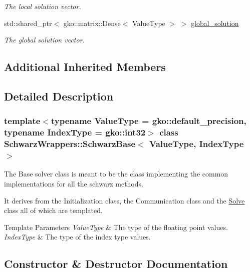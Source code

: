 \begin{DoxyCompactItemize}
\begin{DoxyCompactList}\small\item\em The local solution vector. \end{DoxyCompactList}\item 
\mbox{\label{classSchwarzWrappers_1_1SchwarzBase_a0c7d2f1b2a97968bd662ba3cbac800f6}} 
std\+::shared\+\_\+ptr$<$ gko\+::matrix\+::\+Dense$<$ Value\+Type $>$ $>$ \hyperlink{classSchwarzWrappers_1_1SchwarzBase_a0c7d2f1b2a97968bd662ba3cbac800f6}{global\+\_\+solution}
\begin{DoxyCompactList}\small\item\em The global solution vector. \end{DoxyCompactList}\end{DoxyCompactItemize}
\subsection*{Additional Inherited Members}


\subsection{Detailed Description}
\subsubsection*{template$<$typename Value\+Type = gko\+::default\+\_\+precision, typename Index\+Type = gko\+::int32$>$\newline
class Schwarz\+Wrappers\+::\+Schwarz\+Base$<$ Value\+Type, Index\+Type $>$}

The Base solver class is meant to be the class implementing the common implementations for all the schwarz methods. 

It derives from the Initialization class, the Communication class and the \hyperlink{classSchwarzWrappers_1_1Solve}{Solve} class all of which are templated.


\begin{DoxyTemplParams}{Template Parameters}
{\em Value\+Type} & The type of the floating point values. \\
\hline
{\em Index\+Type} & The type of the index type values. \\
\hline
\end{DoxyTemplParams}


\subsection{Constructor \& Destructor Documentation}
\mbox{\label{classSchwarzWrappers_1_1SchwarzBase_a158b6450f7b00d3128c39365cde780d0}} 
